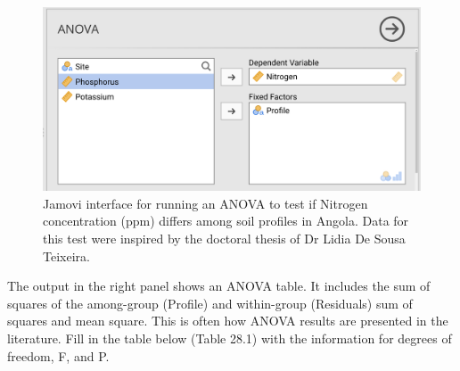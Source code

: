 \documentclass[
  openany]{krantz}
\begin{document}
\begin{figure}
\includegraphics[width=1\linewidth]{img/jamovi_ANOVA_input} \caption{Jamovi interface for running an ANOVA to test if Nitrogen concentration (ppm) differs among soil profiles in Angola. Data for this test were inspired by the doctoral thesis of Dr Lidia De Sousa Teixeira.}\label{fig:unnamed-chunk-113}
\end{figure}

The output in the right panel shows an ANOVA table.
It includes the sum of squares of the among-group (Profile) and within-group (Residuals) sum of squares and mean square.
This is often how ANOVA results are presented in the literature.
Fill in the table below (Table 28.1) with the information for degrees of freedom, F, and P.
\end{document}
